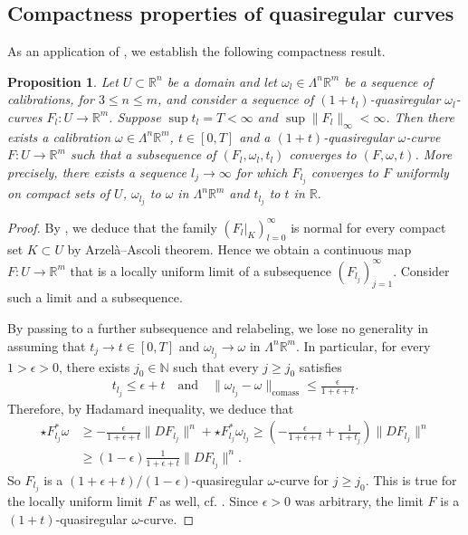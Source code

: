 \documentclass[a4paper,leqno,11pt]{amsart}
\numberwithin{equation}{section}
\newtheorem{proposition}[theorem]{Proposition}
\theoremstyle{remark}
\theoremstyle{remark}
\newcommand{\comass}{\mathrm{comass}}
\begin{document}
\subsection{Compactness properties of quasiregular curves}
As an application of , we establish the following compactness result.
\begin{proposition}\label{prop:normalfamily}
Let $U \subset \mathbb{R}^n$ be a domain and let $\omega_l \in \Lambda^n \mathbb{R}^m$ be a sequence of calibrations, for $3 \leq n \leq m$, and consider a sequence of $( 1+t_l)$-quasiregular $\omega_l$-curves $F_l \colon U \rightarrow \mathbb{R}^m$. Suppose $\sup t_l = T < \infty$ and $\sup \| F_l \|_\infty < \infty$. Then there exists a calibration $\omega \in \Lambda^n \mathbb{R}^m$, $t \in [0,T]$ and a $( 1+t )$-quasiregular $\omega$-curve $F \colon U \to \mathbb{R}^m$ such that a subsequence of $( F_l, \omega_l, t_l )$ converges to $( F, \omega, t )$. More precisely, there exists a sequence $l_j \rightarrow \infty$ for which $F_{ l_j }$ converges to $F$ uniformly on compact sets of $U$, $\omega_{ l_j }$ to $\omega$ in $\Lambda^{n} \mathbb{R}^m$ and $t_{ l_j }$ to $t$ in $\mathbb{R}.$
\end{proposition}
\begin{proof}
By , we deduce that the family $( F_l|_{ K } )_{ l = 0 }^{ \infty }$ is normal for every compact set $K \subset U$ by Arzelà--Ascoli theorem. Hence we obtain a continuous map $F \colon U \to \mathbb{R}^m$ that is a locally uniform limit of a subsequence $( F_{l_j} )_{ j = 1 }^{ \infty }$. Consider such a limit and a subsequence.

By passing to a further subsequence and relabeling, we lose no generality in assuming that $t_j \rightarrow t \in [0,T]$ and $\omega_{l_j} \rightarrow \omega$ in $\Lambda^{n} \mathbb{R}^m$. In particular, for every $1 > \epsilon > 0$, there exists $j_0 \in \mathbb{N}$ such that every $j \geq j_0$ satisfies
\begin{align*}
    t_{l_j} \leq \epsilon + t
    \quad\text{and}\quad
    \|\omega_{l_j} - \omega\|_{ \comass }
    \leq
    \frac{ \epsilon }{ 1 + \epsilon + t }.
\end{align*}
Therefore, by Hadamard inequality, we deduce that
\begin{align*}
    \star F^{*}_{ l_j }\omega
    &\geq
    -
    \frac{ \epsilon }{ 1 + \epsilon + t }
    \| DF_{ l_j } \|^n
    +
    \star F^{*}_{ l_j }\omega_{ l_j }
    \geq
    \left( - \frac{ \epsilon }{ 1 + \epsilon + t } + \frac{ 1 }{ 1 + t_j } \right) \| DF_{ l_j } \|^n
    \\
    &\geq
    \left( 1 - \epsilon \right)
    \frac{ 1 }{ 1 + \epsilon + t }
    \| DF_{ l_j } \|^n.
\end{align*}
So $F_{ l_j }$ is a $( 1 + \epsilon + t )/( 1 - \epsilon )$-quasiregular $\omega$-curve for $j \geq j_0$. This is true for the locally uniform limit $F$ as well, cf. \cite[Theorem 4.1]{Pan:20}. Since $\epsilon > 0$ was arbitrary, the limit $F$ is a $(1+t)$-quasiregular $\omega$-curve.
\end{proof}
\end{document}
